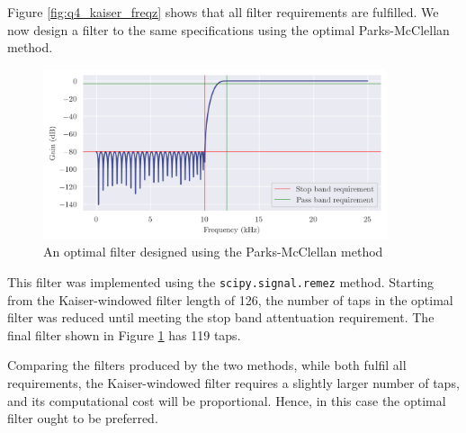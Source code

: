 Figure \ref{fig:q4_kaiser_freqz} shows that all filter requirements are fulfilled. We now design a filter to the same specifications using the optimal Parks-McClellan method.

\newpage

\begin{figure}[ht]
    \centering
    \includegraphics[width=0.9\textwidth]{images/q4_optimal_freqz.png}
    \caption{An optimal filter designed using the Parks-McClellan method}
    \label{fig:q4_optimal_freqz}
\end{figure}

This filter was implemented using the \texttt{scipy.signal.remez} method. Starting from the Kaiser-windowed filter length of 126, the number of taps in the optimal filter was reduced until meeting the stop band attentuation requirement. The final filter shown in Figure \ref{fig:q4_optimal_freqz} has 119 taps.

Comparing the filters produced by the two methods, while both fulfil all requirements, the Kaiser-windowed filter requires a slightly larger number of taps, and its computational cost will be proportional. Hence, in this case the optimal filter ought to be preferred.
